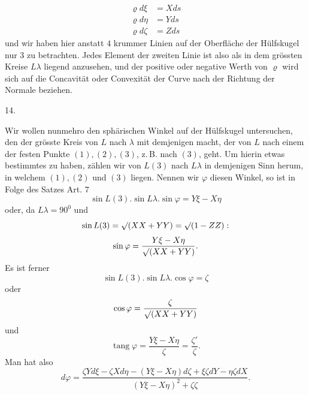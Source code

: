 %
\[
\begin{aligned}
\varrho d\xi&=Xds\\
\varrho d\eta&=Yds\\
\varrho d\zeta&=Zds
\end{aligned}
\]
und wir haben hier anstatt $4$ krummer Linien auf der Oberfläche der Hülfskugel nur $3$ zu betrachten. Jedes Element der zweiten Linie ist also als in dem grössten Kreise $L\lambda$ liegend anzusehen, und der positive oder negative Werth von $\varrho$ wird sich auf die Concavität oder Convexität der Curve nach der Richtung der Normale beziehen.

\begin{center}14.\end{center}
\noindent\hspace*{1.2em}Wir wollen nunmehro den sphärischen Winkel auf der Hülfskugel untersuchen, den der grösste Kreis von $L$ nach $\lambda$ mit demjenigen macht, der von $L$ nach einem der festen Punkte $(1),(2),(3)$, z.\,B. nach $(3)$, geht. Um hierin etwas bestimmtes zu haben, zählen wir von $L(3)$ nach $L\lambda$ in demjenigen Sinn herum, in welchem $(1),(2)$ und $(3)$ liegen. Nennen wir $\varphi$ diesen Winkel, so ist in Folge des Satzes Art. $7$
\[
\sin L(3).\sin L\lambda.\sin\varphi=Y\xi-X\eta
\]
oder, da $L\lambda=90^{0}$ und
\[
\sin L(3)=\mathord{\surd}(XX+YY)=\mathord{\surd}(1-ZZ):
\]
\[
\sin\varphi=\frac{Y\xi-X\eta}{\mathord{\surd}(XX+YY)}.
\]
Es ist ferner
\[
\sin L(3).\sin L\lambda.\cos\varphi=\zeta
\]
oder
\[
\cos\varphi=\frac{\zeta}{\mathord{\surd}(XX+YY)}
\]
und
\[
\operatorname{tang}\varphi=\frac{Y\xi-X\eta}{\zeta}=\frac{\zeta'}{\zeta}.
\]
Man hat also
\[
d\varphi=\frac{\zeta Yd\xi-\zeta Xd\eta-(Y\xi-X\eta)d\zeta+\xi\zeta dY-\eta\zeta dX}{(Y\xi-X\eta)^{2}+\zeta\zeta}.
\]
